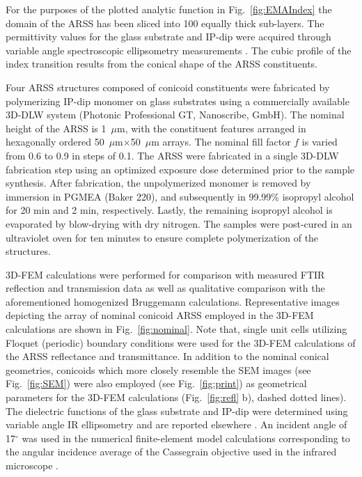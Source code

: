 \documentclass[9pt,twocolumn,twoside]{osajnl}
\begin{document}
For the purposes of the plotted analytic function in Fig.~\ref{fig:EMAIndex} the domain of the ARSS has been sliced into 100 equally thick sub-layers. The permittivity values for the glass substrate and IP-dip were acquired through variable angle spectroscopic ellipsometry measurements \cite{FullagerOME7_2017}. The cubic profile of the index transition results from the conical shape of the ARSS constituents. 
 
Four ARSS structures composed of conicoid constituents were fabricated by polymerizing IP-dip monomer on glass substrates using a commercially available 3D-DLW system (Photonic Professional GT, Nanoscribe, GmbH). The nominal height of the ARSS is 1~$\mu$m, with the constituent features arranged in hexagonally ordered 50~$\mu$m$\times$50~$\mu$m arrays. The nominal fill factor $f$ is varied from 0.6 to 0.9 in steps of 0.1. The ARSS were fabricated in a single 3D-DLW fabrication step using an optimized exposure dose determined prior to the sample synthesis. After fabrication, the unpolymerized monomer is removed by immersion in PGMEA (Baker 220), and subsequently in 99.99\% isopropyl alcohol for 20 min and 2 min, respectively. Lastly, the remaining isopropyl alcohol is evaporated by blow-drying with dry nitrogen. The samples were post-cured in an ultraviolet oven for ten minutes to ensure complete polymerization of the structures. 

3D-FEM calculations were performed for comparison with measured FTIR reflection and transmission data as well as qualitative comparison with the aforementioned homogenized Bruggemann calculations. Representative images depicting the array of nominal conicoid ARSS employed in the 3D-FEM calculations are shown in Fig.~\ref{fig:nominal}. Note that, single unit cells utilizing Floquet (periodic) boundary conditions were used for the 3D-FEM calculations of the ARSS reflectance and transmittance. In addition to the nominal conical geometries, conicoids which more closely resemble the SEM images (see Fig.~\ref{fig:SEM}) were also employed (see Fig.~\ref{fig:print}) as geometrical parameters for the 3D-FEM calculations (Fig.~\ref{fig:refl} b), dashed dotted lines). The dielectric functions of the glass substrate and IP-dip were determined using variable angle IR ellipsometry and are reported elsewhere \cite{FullagerOME7_2017}. An incident angle of 17$^{\circ}$ was used in the numerical finite-element model calculations corresponding to the angular incidence average of the Cassegrain objective used in the infrared microscope \cite{HinrichsJPCC117_2013}.
\end{document}

